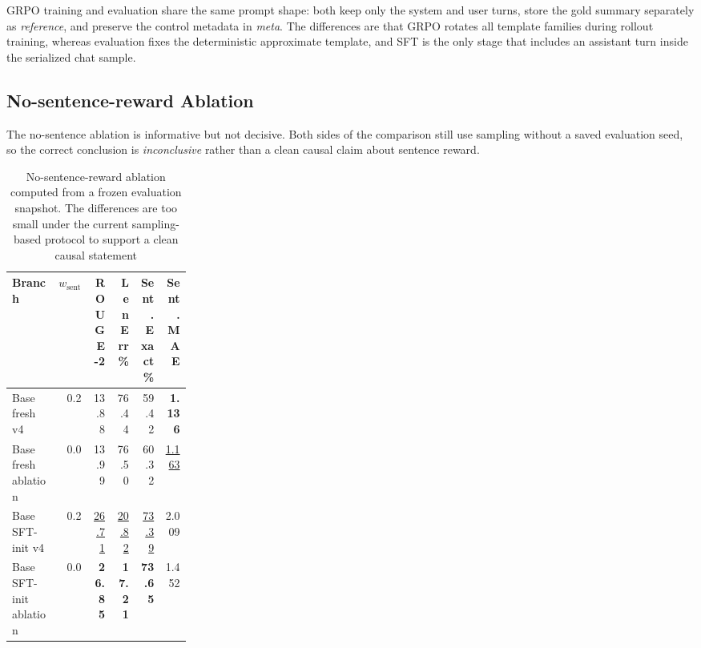 \documentclass[11pt]{article}
\newcommand{\best}[1]{\textbf{#1}}
\newcommand{\second}[1]{\underline{#1}}
\begin{document}
GRPO training and evaluation share the same prompt shape: both keep only the system and user turns, store the gold summary separately as \textit{reference}, and preserve the control metadata in \textit{meta}.
The differences are that GRPO rotates all template families during rollout training, whereas evaluation fixes the deterministic approximate template, and SFT is the only stage that includes an assistant turn inside the serialized chat sample.

\subsection{No-sentence-reward Ablation}
\label{sec:appendix-nosentence}
The no-sentence ablation is informative but not decisive.
Both sides of the comparison still use sampling without a saved evaluation seed, so the correct conclusion is \emph{inconclusive} rather than a clean causal claim about sentence reward.

\begin{table}[H]
\centering
\caption{No-sentence-reward ablation computed from a frozen evaluation snapshot. The differences are too small under the current sampling-based protocol to support a clean causal statement}
\label{tab:appendix-nosentence}
\small
\begin{tabular}{L{0.26\linewidth}rrrrr}
\toprule
Branch & $w_{\mathrm{sent}}$ & ROUGE-2 & LenErr\% & Sent. Exact\% & Sent. MAE \\
\midrule
Base fresh v4 & 0.2 & 13.88 & 76.44 & 59.42 & \best{1.136} \\
Base fresh ablation & 0.0 & 13.99 & 76.50 & 60.32 & \second{1.163} \\
Base SFT-init v4 & 0.2 & \second{26.71} & \second{20.82} & \second{73.39} & 2.009 \\
Base SFT-init ablation & 0.0 & \best{26.85} & \best{17.21} & \best{73.65} & 1.452 \\
\bottomrule
\end{tabular}
\end{table}


\end{document}
